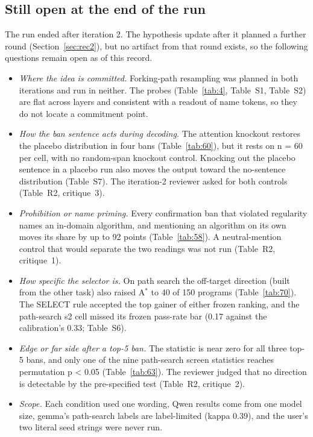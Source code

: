 \documentclass[11pt,letterpaper]{article}
\begin{document}
\subsection{Still open at the end of the run}

The run ended after iteration 2. The hypothesis update after it planned a further round (Section~\ref{sec:rec2}), but no artifact from that round exists, so the following questions remain open as of this record.

\begin{itemize}
\item \emph{Where the idea is committed.} Forking-path resampling was planned in both iterations and run in neither. The probes (Table~\ref{tab:4}, Table~S1, Table~S2) are flat across layers and consistent with a readout of name tokens, so they do not locate a commitment point.
\item \emph{How the ban sentence acts during decoding.} The attention knockout restores the placebo distribution in four bans (Table~\ref{tab:60}), but it rests on n = 60 per cell, with no random-span knockout control. Knocking out the placebo sentence in a placebo run also moves the output toward the no-sentence distribution (Table~S7). The iteration-2 reviewer asked for both controls (Table~R2, critique~3).
\item \emph{Prohibition or name priming.} Every confirmation ban that violated regularity names an in-domain algorithm, and mentioning an algorithm on its own moves its share by up to 92 points (Table~\ref{tab:58}). A neutral-mention control that would separate the two readings was not run (Table~R2, critique~1).
\item \emph{How specific the selector is.} On path search the off-target direction (built from the other task) also raised A$^*$ to 40 of 150 programs (Table~\ref{tab:70}). The SELECT rule accepted the top gainer of either frozen ranking, and the path-search s2 cell missed its frozen pass-rate bar (0.17 against the calibration's 0.33; Table~S6).
\item \emph{Edge or far side after a top-5 ban.} The statistic is near zero for all three top-5 bans, and only one of the nine path-search screen statistics reaches permutation p < 0.05 (Table~\ref{tab:63}). The reviewer judged that no direction is detectable by the pre-specified test (Table~R2, critique~2).
\item \emph{Scope.} Each condition used one wording, Qwen results come from one model size, gemma's path-search labels are label-limited (kappa 0.39), and the user's two literal seed strings were never run.
\end{itemize}
\end{document}
